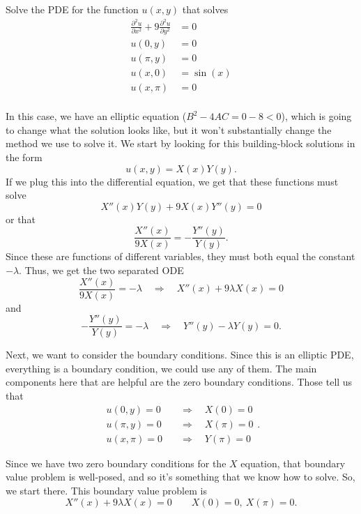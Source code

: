 \documentclass{ximera}
\begin{document}
\begin{example} 
    Solve the PDE for the function $u(x,y)$ that solves
    \[
        \begin{split}
            \frac{\partial^2 u}{\partial x^2} + 9\frac{\partial^2 u}{\partial y^2} &= 0 \\
            u(0, y) &= 0 \\
            u(\pi, y) &= 0 \\
            u(x, 0) &= \sin(x) \\
            u(x, \pi) &= 0 \\
        \end{split}
    \]
\end{example}

\begin{exampleSol}
    In this case, we have an elliptic equation ($B^2 - 4AC = 0 - 8 < 0$), which is going to change what the solution looks like, but it won't substantially change the method we use to solve it. We start by looking for this building-block solutions in the form
    \[ 
        u(x,y) = X(x)Y(y). 
    \] 
    If we plug this into the differential equation, we get that these functions must solve
    \[ 
        X''(x)Y(y) + 9X(x)Y''(y) = 0 
    \] 
    or that
    \[ 
        \frac{X''(x)}{9X(x)} = - \frac{Y''(y)}{Y(y)}. 
    \] 
    Since these are functions of different variables, they must both equal the constant $-\lambda$. Thus, we get the two separated ODE
    \[ 
        \frac{X''(x)}{9X(x)} = -\lambda \quad \Rightarrow \quad X''(x) + 9\lambda X(x) = 0 
    \] 
    and
    \[ 
        -\frac{Y''(y)}{Y(y)} = -\lambda \quad \Rightarrow \quad Y''(y) - \lambda Y(y) = 0. 
    \]
    
    Next, we want to consider the boundary conditions. Since this is an elliptic PDE, everything is a boundary condition, we could use any of them. The main components here that are helpful are the zero boundary conditions. Those tell us that
    \[ 
        \begin{split}
            u(0, y) = 0 \quad & \Rightarrow \quad X(0) = 0  \\
            u(\pi, y)  = 0 \quad & \Rightarrow \quad X(\pi) = 0 \\
            u(x, \pi)  = 0 \quad & \Rightarrow \quad Y(\pi) = 0 
        \end{split}. 
    \]
    
    Since we have two zero boundary conditions for the $X$ equation, that boundary value problem is well-posed, and so it's something that we know how to solve. So, we start there. This boundary value problem is
    \[  
        X''(x) + 9\lambda X(x) = 0 \qquad X(0) = 0,\ X(\pi) = 0.
    \]
    

\end{exampleSol}
\end{document}
